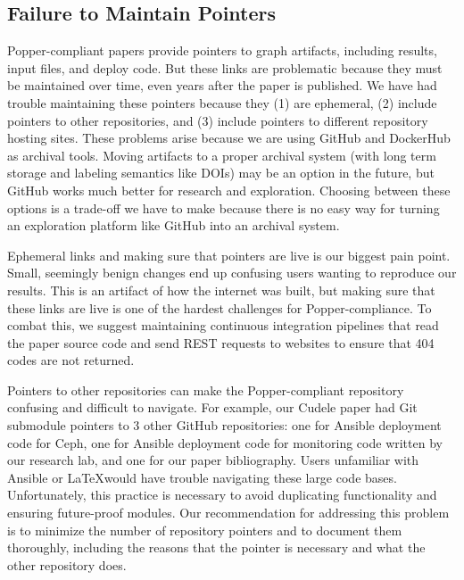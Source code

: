 \subsection{Failure to Maintain Pointers}

Popper-compliant papers provide pointers to graph artifacts, including results,
input files, and deploy code. But these links are problematic because they must
be maintained over time, even years after the paper is published. We have had
trouble maintaining these pointers because they (1) are ephemeral, (2) include
pointers to other repositories, and (3) include pointers to different
repository hosting sites. These problems arise because we are using GitHub and
DockerHub as archival tools. Moving artifacts to a proper archival system (with
long term storage and labeling semantics like DOIs) may be an option in the
future, but GitHub works much better for research and exploration. Choosing
between these options is a trade-off we have to make because there is no easy
way for turning an exploration platform like GitHub into an archival system.

Ephemeral links and making sure that pointers are live is our biggest pain
point. Small, seemingly benign changes end up confusing users wanting to
reproduce our results. This is an artifact of how the internet was built, but
making sure that these links are live is one of the hardest challenges for
Popper-compliance. To combat this, we suggest maintaining continuous
integration pipelines that read the paper source code and send REST requests to
websites to ensure that 404 codes are not returned.

Pointers to other repositories can make the Popper-compliant repository
confusing and difficult to navigate. For example, our Cudele paper had Git
submodule pointers to 3 other GitHub repositories: one for Ansible deployment
code for Ceph, one for Ansible deployment code for monitoring code written by
our research lab, and one for our paper bibliography. Users unfamiliar with
Ansible or \LaTeX would have trouble navigating these large code bases.
Unfortunately, this practice is necessary to avoid duplicating functionality
and ensuring future-proof modules. Our recommendation for addressing this
problem is to minimize the number of repository pointers and to document them
thoroughly, including the reasons that the pointer is necessary and what the
other repository does.

